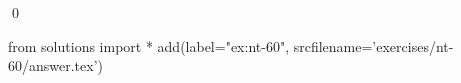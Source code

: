 
\begin{ex} 
  \label{ex:nt-60}
  
  \qed
\end{ex} 
\begin{python0}
from solutions import *
add(label="ex:nt-60",
    srcfilename='exercises/nt-60/answer.tex') 
\end{python0}
